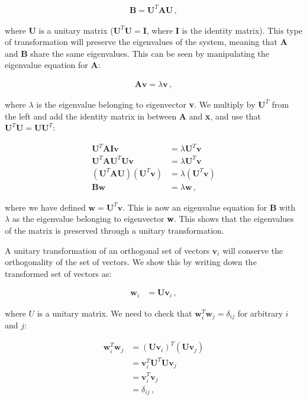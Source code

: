 \documentclass[reprint,english,notitlepage]{revtex4-1}  %
\begin{document}
\begin{align*}
\textbf{B} = \textbf{U}^T \textbf{AU} \, ,
\end{align*}

where \textbf{U} is a unitary matrix ($\textbf{U}^T\textbf{U} = \textbf{I}$, where \textbf{I} is the identity matrix). This type of transformation will preserve the eigenvalues of the system, meaning that \textbf{A} and \textbf{B} share the same eigenvalues. This can be seen by manipulating the eigenvalue equation for \textbf{A}:

\begin{align*}
\textbf{A}\textbf{v} = \lambda \textbf{v} \, ,
\end{align*}

where $\lambda$ is the eigenvalue belonging to eigenvector \textbf{v}. We multiply by $\textbf{U}^T$ from the left and add the identity matrix in between \textbf{A} and \textbf{x}, and use that $\textbf{U}^T \textbf{U} = \textbf{UU}^T$:

\begin{align*}
\textbf{U}^T \textbf{AIv} &= \lambda \textbf{U}^T \textbf{v} \\
\textbf{U}^T \textbf{AU}^T \textbf{Uv} &= \lambda \textbf{U}^T \textbf{v} \\
(\textbf{U}^T \textbf{AU} ) (\textbf{U}^T \textbf{v}) &= \lambda (\textbf{U}^T \textbf{v}) \\
\textbf{Bw} &= \lambda \textbf{w} \, ,
\end{align*}

where we have defined $\textbf{w} = \textbf{U}^T \textbf{v}$. This is now an eigenvalue equation for \textbf{B} with $\lambda$ as the eigenvalue belonging to eigenvector \textbf{w}. This shows that the eigenvalues of the matrix is preserved through a unitary transformation.

A unitary transformation of an orthogonal set of vectors $\textbf{v}_i$ will conserve the orthogonality of the set of vectors. We show this by writing down the transformed set of vectors as:

\begin{align*}
\textbf{w}_i &= \textbf{U} \textbf{v}_i \, ,
\end{align*}

where $U$ is a unitary matrix. We need to check that $\textbf{w}_i^T \textbf{w}_j = \delta_{ij}$ for arbitrary $i$ and $j$:

\begin{align*}
\textbf{w}_i^T \textbf{w}_j &= (\textbf{U}\textbf{v}_i)^T (\textbf{U}\textbf{v}_j) \\
&= \textbf{v}_i^T \textbf{U}^T \textbf{U} \textbf{v}_j \\
&= \textbf{v}_i^T \textbf{v}_j \\
&= \delta_{ij} \, ,
\end{align*}
\end{document}
